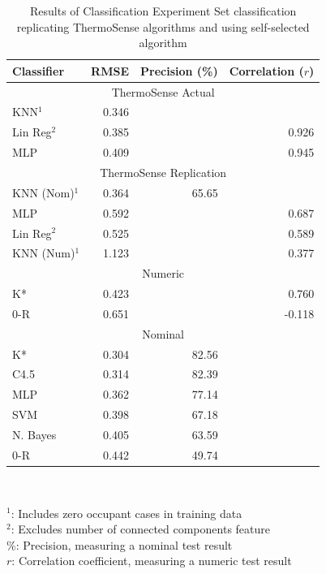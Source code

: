 \documentclass[../thesis/thesis.tex]{subfiles}
\begin{document}
\begin{table}
\centering
\begin{tabular}{|l|r|r|r|}
\hline
\textbf{Classifier} & \textbf{RMSE} & \textbf{Precision (\%)} & \textbf{Correlation ($r$)} \\ \hline
\multicolumn{4}{|c|}{\cellcolor{black!15} ThermoSense Actual}                         \\ \hline
KNN$^1$             & 0.346         &             &              \\ \hline
Lin Reg$^2$         & 0.385         &             & 0.926        \\ \hline
MLP                 & 0.409         &             & 0.945        \\ \hline
\multicolumn{4}{|c|}{\cellcolor{black!15} ThermoSense Replication}                    \\ \hline
KNN (Nom)$^1$       & 0.364         & 65.65       &              \\ \hline
MLP                 & 0.592         &             & 0.687        \\ \hline
Lin Reg$^2$         & 0.525         &             & 0.589        \\ \hline
KNN (Num)$^1$       & 1.123         &             & 0.377        \\ \hline
\multicolumn{4}{|c|}{\cellcolor{black!15} Numeric}                                    \\ \hline
K*                  & 0.423         &             & 0.760        \\ \hline
0-R                 & 0.651         &             & -0.118       \\ \hline
\multicolumn{4}{|c|}{\cellcolor{black!15} Nominal}                                    \\ \hline
K*                  & 0.304         & 82.56       &              \\ \hline
C4.5                & 0.314         & 82.39       &              \\ \hline
MLP                 & 0.362         & 77.14       &              \\ \hline
SVM                 & 0.398         & 67.18       &              \\ \hline
N. Bayes            & 0.405         & 63.59       &              \\ \hline
0-R                 & 0.442         & 49.74       &              \\ \hline
\end{tabular}\\
\parbox{300pt}{
$^1$: Includes zero occupant cases in training data \\
$^2$: Excludes number of connected components feature \\
\%: Precision, measuring a nominal test result \\
$r$: Correlation coefficient, measuring a numeric test result \\
}
\caption{Results of Classification Experiment Set classification replicating ThermoSense algorithms and using self-selected algorithm}
\label{tab:results:set1}
\end{table}
\end{document}
